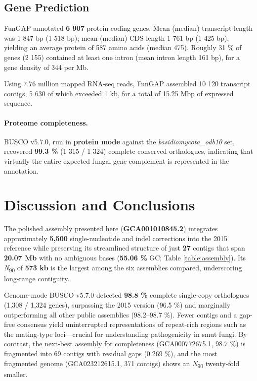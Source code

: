 \documentclass[Journal,letterpaper]{ascelike-new}
\begin{document}
\subsection*{Gene Prediction}

FunGAP annotated \textbf{6 907} protein-coding genes.
Mean (median) transcript length was 1 847 bp (1 518 bp); mean (median) CDS length
1 761 bp (1 425 bp), yielding an average protein of 587 amino acids (median 475).
Roughly 31 \% of genes (2 155) contained at least one intron (mean intron length
161 bp), for a gene density of 344 per Mb.

Using 7.76 million mapped RNA-seq reads, FunGAP assembled
10 120 transcript contigs, 5 630 of which exceeded 1 kb, for a total of
15.25 Mbp of expressed sequence.

\paragraph{Proteome completeness.}
BUSCO v5.7.0, run in \textbf{protein mode} against the
\textit{basidiomycota\_odb10} set, recovered
\textbf{99.3 \%} (1 315 / 1 324) complete conserved orthologues, indicating that
virtually the entire expected fungal gene complement is represented in the
annotation.


\section*{Discussion and Conclusions}

The polished assembly presented here (\textbf{GCA001010845.2}) integrates
approximately \textbf{5,500} single-nucleotide and indel corrections into the
2015 reference while preserving its streamlined structure of just
\textbf{27} contigs that span \textbf{20.07 Mb} with no ambiguous bases
(\textbf{55.06 \%} GC; Table \ref{table:assembly}).  
Its \textit{N}\textsubscript{90} of \textbf{573 kb} is the largest among the six
assemblies compared, underscoring long-range contiguity.

Genome-mode BUSCO v5.7.0 detected \textbf{98.8 \%} complete single-copy
orthologues (1,308 / 1,324 genes), surpassing the 2015 version (96.5 \%) and
marginally outperforming all other public assemblies (98.2–98.7 \%).  
Fewer contigs and a gap-free consensus yield uninterrupted representations of
repeat-rich regions such as the mating-type loci—crucial for understanding
pathogenicity in smut fungi.  
By contrast, the next-best assembly for completeness
(GCA000772675.1, 98.7 \%) is fragmented into 69 contigs with residual gaps
(0.269 \%), and the most fragmented genome (GCA023212615.1, 371 contigs) shows
an \textit{N}\textsubscript{90} twenty-fold smaller.
\end{document}
